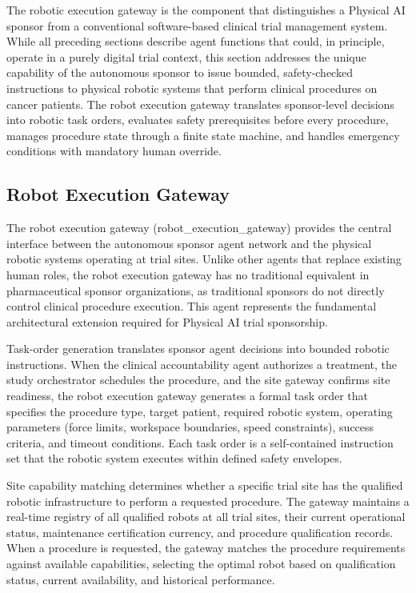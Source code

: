 
The robotic execution gateway is the component that distinguishes a Physical AI sponsor from
a conventional software-based clinical trial management system. While all preceding sections
describe agent functions that could, in principle, operate in a purely digital trial context,
this section addresses the unique capability of the autonomous sponsor to issue bounded,
safety-checked instructions to physical robotic systems that perform clinical procedures on
cancer patients. The robot execution gateway translates sponsor-level decisions into robotic
task orders, evaluates safety prerequisites before every procedure, manages procedure state
through a finite state machine, and handles emergency conditions with mandatory human override.

\subsection{Robot Execution Gateway}

The robot execution gateway (robot\_execution\_gateway) provides the central interface between
the autonomous sponsor agent network and the physical robotic systems operating at trial
sites. Unlike other agents that replace existing human roles, the robot execution gateway
has no traditional equivalent in pharmaceutical sponsor organizations, as traditional
sponsors do not directly control clinical procedure execution. This agent represents the
fundamental architectural extension required for Physical AI trial sponsorship.

Task-order generation translates sponsor agent decisions into bounded robotic instructions.
When the clinical accountability agent authorizes a treatment, the study orchestrator
schedules the procedure, and the site gateway confirms site readiness, the robot execution
gateway generates a formal task order that specifies the procedure type, target patient,
required robotic system, operating parameters (force limits, workspace boundaries, speed
constraints), success criteria, and timeout conditions. Each task order is a self-contained
instruction set that the robotic system executes within defined safety envelopes.

Site capability matching determines whether a specific trial site has the qualified robotic
infrastructure to perform a requested procedure. The gateway maintains a real-time registry
of all qualified robots at all trial sites, their current operational status, maintenance
certification currency, and procedure qualification records. When a procedure is requested,
the gateway matches the procedure requirements against available capabilities, selecting the
optimal robot based on qualification status, current availability, and historical performance.

